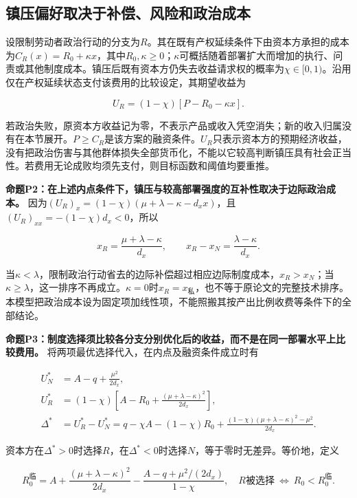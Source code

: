 \documentclass[UTF8,fontset=windows,12pt,a4paper,oneside,openany]{ctexbook}
\begin{document}
\subsection{镇压偏好取决于补偿、风险和政治成本}

设限制劳动者政治行动的分支为$R$。其在既有产权延续条件下由资本方承担的成本为$C_R(x)=R_0+\kappa x$，其中$R_0,\kappa\geq0$；$\kappa$可概括随着部署扩大而增加的执行、问责或其他制度成本。镇压后既有资本方仍失去收益请求权的概率为$\chi\in[0,1)$。沿用仅在产权延续状态支付该费用的比较设定，其期望收益为

\[
U_R=(1-\chi)[P-R_0-\kappa x].
\tag{14-P6}
\]

若政治失败，原资本方收益记为零，不表示产品或收入凭空消失；新的收入归属没有在本节展开。$P\geq C_R$是该方案的融资条件。$U_R$只表示资本方的预期经济收益，没有把政治伤害与其他群体损失全部货币化，不能以它较高判断镇压具有社会正当性。若费用无论成败均须先支付，则目标函数和阈值均要重推。

\textbf{命题P2：在上述内点条件下，镇压与较高部署强度的互补性取决于边际政治成本。} 因为$(U_R)_x=(1-\chi)(\mu+\lambda-\kappa-d_xx)$，且$(U_R)_{xx}=-(1-\chi)d_x<0$，所以

\[
x_R=\frac{\mu+\lambda-\kappa}{d_x},\qquad
x_R-x_N=\frac{\lambda-\kappa}{d_x}.
\tag{14-P7}
\]

当$\kappa<\lambda$，限制政治行动省去的边际补偿超过相应边际制度成本，$x_R>x_N$；当$\kappa\geq\lambda$，这一排序不再成立。$\kappa=0$时$x_R=x_{\mathrm{私}}$，也不等于原论文的完整技术排序。本模型把政治成本设为固定项加线性项，不能照搬其按产出比例收费等条件下的全部结论。

\textbf{命题P3：制度选择须比较各分支分别优化后的收益，而不是在同一部署水平上比较费用。} 将两项最优选择代入，在内点及融资条件成立时有

\[
\begin{aligned}
U_N^*&=A-q+\frac{\mu^2}{2d_x},\\
U_R^*&=(1-\chi)\left[A-R_0+
                  \frac{(\mu+\lambda-\kappa)^2}{2d_x}\right],\\
\Delta^*&=U_R^*-U_N^*
 =q-\chi A-(1-\chi)R_0+
 \frac{(1-\chi)(\mu+\lambda-\kappa)^2-\mu^2}{2d_x}.
\end{aligned}
\tag{14-P8}
\]

资本方在$\Delta^*>0$时选择$R$，在$\Delta^*<0$时选择$N$，等于零时无差异。等价地，定义

\[
R_0^{\mathrm{临}}=A+\frac{(\mu+\lambda-\kappa)^2}{2d_x}
-\frac{A-q+\mu^2/(2d_x)}{1-\chi},
\quad R\text{被选择}\ \Longleftrightarrow\ R_0<R_0^{\mathrm{临}}.
\tag{14-P9}
\]
\end{document}
